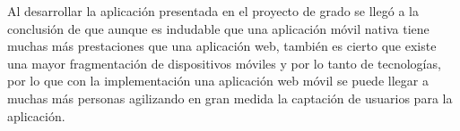Al desarrollar la aplicación presentada en el proyecto de grado se llegó a la conclusión de que aunque
es indudable que una aplicación móvil nativa tiene muchas más prestaciones que una aplicación web, también es cierto que existe una mayor fragmentación de dispositivos móviles y  por lo tanto de tecnologías, por lo que con la implementación una aplicación web móvil se puede llegar a muchas más personas agilizando en gran medida la captación de usuarios para la aplicación.




%
%
%
%
%

